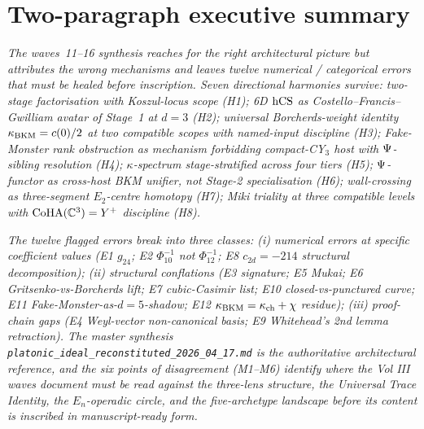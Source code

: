 \section{Two-paragraph executive summary}
\label{wn:sec:wave17-agent15-summary}

\emph{The waves~11--16 synthesis reaches for the right architectural
picture but attributes the wrong mechanisms and leaves twelve
numerical / categorical errors that must be healed before inscription.
Seven directional harmonies survive: two-stage factorisation with
Koszul-locus scope (H1); 6D $\mathrm{hCS}$ as Costello--Francis--Gwilliam avatar
of Stage~1 at $d = 3$ (H2); universal Borcherds-weight identity
$\kappa_{\mathrm{BKM}} = c(0)/2$ at two compatible scopes with named-input discipline
(H3); Fake-Monster rank obstruction as mechanism forbidding compact-CY$_3$
host with $\Psi$-sibling resolution (H4); $\kappa$-spectrum
stage-stratified across four tiers (H5); $\Psi$-functor as
cross-host BKM unifier, not Stage-2 specialisation (H6); wall-crossing
as three-segment $E_2$-centre homotopy (H7); Miki triality at three
compatible levels with $\mathrm{CoHA}(\mathbb{C}^3) = Y^+$ discipline (H8).}

\emph{The twelve flagged errors break into three classes: (i) numerical
errors at specific coefficient values (E1 $g_{24}$; E2
$\Phi_{10}^{-1}$ not $\Phi_{12}^{-1}$; E8 $c_{2d} = -214$ structural
decomposition); (ii) structural conflations (E3 signature; E5 Mukai;
E6 Gritsenko-vs-Borcherds lift; E7 cubic-Casimir list; E10
closed-vs-punctured curve; E11 Fake-Monster-as-$d=5$-shadow; E12
$\kappa_{\mathrm{BKM}} = \kappa_{\mathrm{ch}} + \chi$ residue); (iii) proof-chain gaps (E4 Weyl-vector
non-canonical basis; E9 Whitehead's 2nd lemma retraction). The
master synthesis
\verb|platonic_ideal_reconstituted_2026_04_17.md| is the authoritative
architectural reference, and the six points of disagreement
(M1--M6) identify where the Vol III waves document must be read
against the three-lens structure, the Universal Trace Identity, the
$E_n$-operadic circle, and the five-archetype landscape before its
content is inscribed in manuscript-ready form.}

